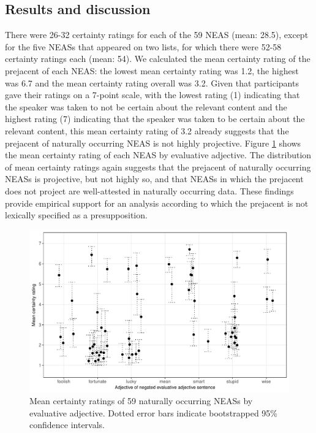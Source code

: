 \documentclass[11pt,fleqn]{article}
\newcommand{\6}{\mbox{$[\hspace*{-.6mm}[$}}
\newcommand{\9}{\mbox{$]\hspace*{-.6mm}]$}}
\begin{document}
\subsection{Results and discussion}

There were 26-32 certainty ratings for each of the 59 NEAS (mean: 28.5), except for the five NEASs that appeared on two lists, for which there were 52-58 certainty ratings each (mean: 54). We calculated the mean certainty rating of the prejacent of each NEAS: the lowest mean certainty rating was 1.2, the highest was 6.7 and the mean certainty rating overall was 3.2. Given that participants gave their ratings on a 7-point scale, with the lowest rating (1) indicating that the speaker was taken to not be certain about the relevant content and the highest rating (7) indicating that the speaker was taken to be certain about the relevant content, this mean certainty rating of 3.2 already suggests that the prejacent of naturally occurring NEAS is not highly projective. Figure \ref{f-corpus} shows the mean certainty rating of each NEAS by evaluative adjective. The distribution of mean certainty ratings again suggests that the prejacent of naturally occurring NEASs is projective, but not highly so, and that NEASs in which the prejacent does not project are well-attested in naturally occurring data. These findings provide empirical support for an analysis according to which the prejacent is not lexically specified as a presupposition. 

\begin{figure}[h!]
\centering

\includegraphics[width=.7\paperwidth]{../exp1-corpus-study/graphs/mean-response-by-item-and-adj}

\caption{Mean certainty ratings of 59 naturally occurring NEASs by evaluative adjective. Dotted error bars indicate bootstrapped 95\% confidence intervals.}\label{f-corpus}

\end{figure}
\end{document}
